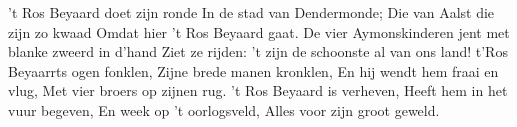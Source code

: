 \beginverse*
't Ros Beyaard doet zijn ronde 
In de stad van Dendermonde; 
Die van Aalst die zijn zo kwaad
Omdat hier 't Ros Beyaard gaat. 
\endverse
\beginverse*
De vier Aymonskinderen jent 
met blanke zweerd in d'hand 
Ziet ze rijden: 't zijn de
schoonste al van ons land! 
\endverse
\beginverse*
t'Ros Beyaarrts ogen fonklen,
Zijne brede manen kronklen,
En hij wendt hem fraai en vlug,
Met vier broers op zijnen rug.
\endverse
\beginverse*
't Ros Beyaard is verheven,
Heeft hem in het vuur begeven,
En week op 't oorlogsveld,
Alles voor zijn groot geweld.
\endverse
\endsong